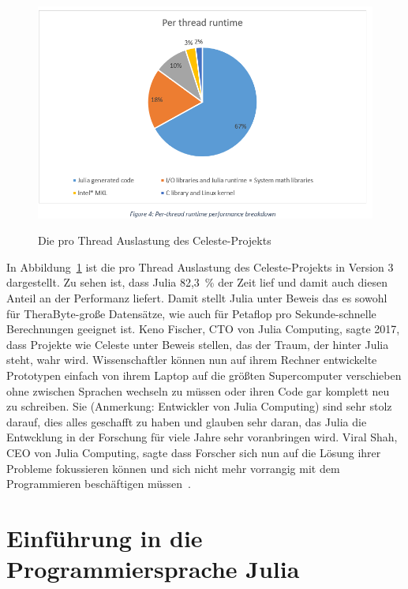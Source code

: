 \documentclass[proseminar,german,utf8]{zihpub}
\begin{document}
\begin{figure}[hbt!]
  \centering
  \includegraphics[scale=0.65, trim={5mm 10mm 5mm 5mm},clip]{bilder/celestejulia.png}
  \caption{Die pro Thread Auslastung des Celeste-Projekts}
  \cite{CelesteNextPlatform}
  \label{fig:celestejulia}
\end{figure}

In Abbildung~\ref{fig:celestejulia} ist die pro Thread Auslastung des Celeste-Projekts in Version 3 dargestellt. Zu sehen ist, dass Julia 82,3~\% der Zeit lief und damit auch diesen Anteil an der Performanz liefert. Damit stellt Julia unter Beweis das es sowohl für TheraByte-große Datensätze, wie auch für Petaflop pro Sekunde-schnelle Berechnungen geeignet ist. Keno Fischer, CTO von Julia Computing, sagte 2017, dass Projekte wie Celeste unter Beweis stellen, das der Traum, der hinter Julia steht, wahr wird. Wissenschaftler können nun auf ihrem Rechner entwickelte Prototypen einfach von ihrem Laptop auf die größten Supercomputer verschieben ohne zwischen Sprachen wechseln zu müssen oder ihren Code gar komplett neu zu schreiben. Sie (Anmerkung: Entwickler von Julia Computing) sind sehr stolz darauf, dies alles geschafft zu haben und glauben sehr daran, das Julia die Entwcklung in der Forschung für viele Jahre sehr voranbringen wird. Viral Shah, CEO von Julia Computing, sagte dass Forscher sich nun auf die Lösung ihrer Probleme fokussieren können und sich nicht mehr vorrangig mit dem Programmieren beschäftigen müssen~\cite{CelesteV2}.

\section{Einführung in die Programmiersprache Julia}
\end{document}
